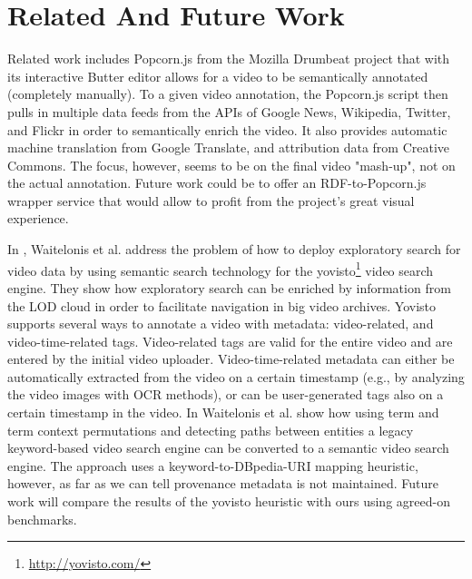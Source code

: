\documentclass{acm_proc_article-sp}
\begin{document}
\section{Related And Future Work}\label{sec:related}
Related work includes Popcorn.js from the Mozilla Drumbeat project\cite{Drumbeat:Popcorn} that with its interactive Butter editor allows for a video to be semantically annotated (completely manually). To a given video annotation, the Popcorn.js script then pulls in multiple data feeds from the APIs of Google News, Wikipedia, Twitter, and Flickr in order to semantically enrich the video. It also provides automatic machine translation from Google Translate, and attribution data from Creative Commons. The focus, however, seems to be on the final video "mash-up", not on the actual annotation. Future work could be to offer an RDF-to-Popcorn.js wrapper service that would allow to profit from the project's great visual experience.

In \cite{Sack:VideoSearch}, Waitelonis et al. address the problem of how to deploy exploratory search for video data by using semantic search technology for the yovisto\footnote{\url{http://yovisto.com/}} video search engine. They show how exploratory search can be enriched by information from the LOD cloud in order to facilitate navigation in big video archives. Yovisto supports several ways to annotate a video with metadata: video-related, and video-time-related tags. Video-related tags are valid for the entire video and are entered by the initial video uploader. Video-time-related metadata can either be automatically extracted from the video on a certain timestamp (e.g., by analyzing the video images with OCR methods), or can be user-generated tags also on a certain timestamp in the video. In \cite{Sack:Use} Waitelonis et al. show how using term and term context permutations and detecting paths between entities a legacy keyword-based video search engine can be converted to a semantic video search engine. The approach uses a keyword-to-DBpedia-URI mapping heuristic, however, as far as we can tell provenance metadata is not maintained. Future work will compare the results of the yovisto heuristic with ours using agreed-on benchmarks.
\end{document}
